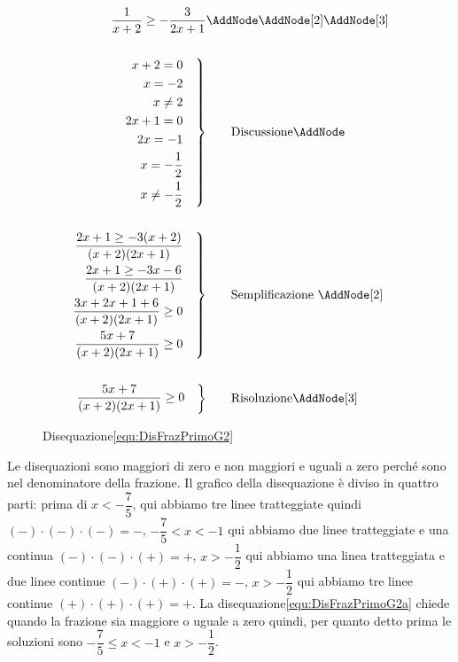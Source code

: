 \begin{figure}
		\centering
\begin{minipage}{\linewidth}
\begin{NodesList}
	\begin{align*}
		\dfrac{1}{x+2}\geq-\dfrac{3}{2x+1}&\AddNode\AddNode[2]\AddNode[3]\\
		&\\
		\left .\begin{aligned}
			 x+2= 0&\\
			 x=-2&\\
			 x\neq 2&\\
			 2x+1= 0&\\
			 2x=-1&\\
			 x=-\dfrac{1}{2}&\\
			 x\neq-\dfrac{1}{2}&& 
		\end{aligned}\right\}&\qquad\text{Discussione}\AddNode\\
		&\\
		\left .\begin{aligned}
			\dfrac{2x+1\geq -3(x+2)}{(x+2)(2x+1)}&\\
			\dfrac{2x+1\geq -3x-6}{(x+2)(2x+1)}&\\
			\dfrac{3x+2x+1+6}{(x+2)(2x+1)}\geq 0&\\
			\dfrac{5x+7}{(x+2)(2x+1)}\geq 0 &&
		\end{aligned}\right\}&\qquad \text{Semplificazione }\AddNode[2]\\
		&\\
	\left .\begin{aligned}
		\dfrac{5x+7}{(x+2)(2x+1)}\geq 0 &&
	\end{aligned}\right\}& \qquad \text{Risoluzione}\AddNode[3]
\end{align*}
	{
	\LinkNodes{}%
	\LinkNodes{}
\LinkNodes{}} %
\end{NodesList}
\end{minipage}
	\captionsetup{format=esempio,list=no}
	\caption{Disequazione\nobs\vref{equ:DisFrazPrimoG2}}
	\label{esempio:DisFrazPrimoG2a}
\end{figure}
Le    
disequazioni\nobs{} sono maggiori di zero e non maggiori e uguali a zero perché sono nel denominatore della frazione. Il grafico della disequazione è diviso in quattro parti: prima di $x<-\dfrac{7}{5} $, qui abbiamo tre linee tratteggiate quindi $(-)\cdot(-)\cdot(-)=-$, $-\dfrac{7}{5}<x<-1$ qui abbiamo due linee tratteggiate e una continua $(-)\cdot(-)\cdot(+)=+$, $x>-\dfrac{1}{2} $ qui abbiamo una linea tratteggiata  e due linee continue $(-)\cdot(+)\cdot(+)=-$, $x>-\dfrac{1}{2}$ qui abbiamo tre linee continue $(+)\cdot(+)\cdot(+)=+$. La disequazione\nobs\vref{equ:DisFrazPrimoG2a} chiede quando la frazione sia maggiore o uguale a zero quindi, per quanto detto prima le soluzioni sono $-\dfrac{7}{5}\leq x<-1$ e $x>-\dfrac{1}{2}$.


